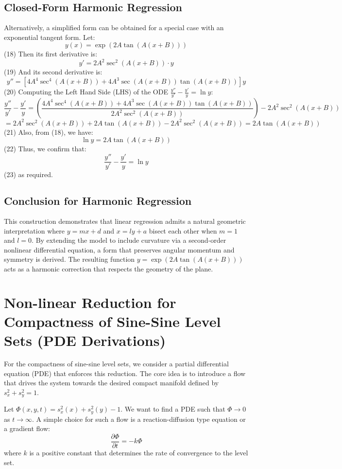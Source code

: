 ﻿\documentclass[12pt]{article}
\begin{document}
\subsection{Closed-Form Harmonic Regression}
Alternatively, a simplified form can be obtained for a special case with an exponential tangent form. Let:
$$ y(x)=\exp(2A\tan(A(x+B))) $$ (18)
Then its first derivative is:
$$ y' = 2A^2\sec^2(A(x+B))\cdot y $$ (19)
And its second derivative is:
$$ y'' = [4A^4\sec^4(A(x+B))+4A^3\sec(A(x+B))\tan(A(x+B))]y $$ (20)
Computing the Left Hand Side (LHS) of the ODE $\frac{y''}{y'} - \frac{y'}{y} = \ln y$:
$$ \frac{y''}{y'} - \frac{y'}{y} = \left(\frac{4A^4\sec^4(A(x+B))+4A^3\sec(A(x+B))\tan(A(x+B))}{2A^2\sec^2(A(x+B))}\right) - 2A^2\sec^2(A(x+B)) $$
$$ = 2A^2\sec^2(A(x+B)) + 2A\tan(A(x+B)) - 2A^2\sec^2(A(x+B)) = 2A\tan(A(x+B)) $$ (21)
Also, from (18), we have:
$$ \ln y = 2A\tan(A(x+B)) $$ (22)
Thus, we confirm that:
$$ \frac{y''}{y'}-\frac{y'}{y}=\ln y $$ (23)
as required.

\subsection{Conclusion for Harmonic Regression}
This construction demonstrates that linear regression admits a natural geometric interpretation where $y=mx+d$ and $x=ly+a$ bisect each other when $m=1$ and $l=0$. By extending the model to include curvature via a second-order nonlinear differential equation, a form that preserves angular momentum and symmetry is derived. The resulting function $y=\exp(2A\tan(A(x+B)))$ acts as a harmonic correction that respects the geometry of the plane.

\section{Non-linear Reduction for Compactness of Sine-Sine Level Sets (PDE Derivations)}
For the compactness of sine-sine level sets, we consider a partial differential equation (PDE) that enforces this reduction. The core idea is to introduce a flow that drives the system towards the desired compact manifold defined by $s_x^2 + s_y^2 = 1$.

Let $\Phi(x,y,t) = s_x^2(x) + s_y^2(y) - 1$. We want to find a PDE such that $\Phi \to 0$ as $t \to \infty$. A simple choice for such a flow is a reaction-diffusion type equation or a gradient flow:
$$ \frac{\partial \Phi}{\partial t} = - k \Phi $$
where $k$ is a positive constant that determines the rate of convergence to the level set.
\end{document}
